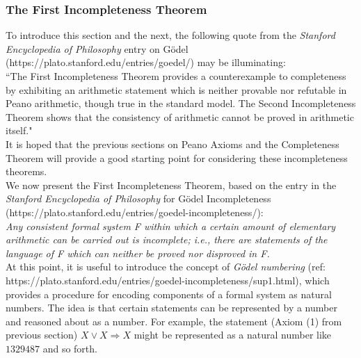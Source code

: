 \subsubsection{The First Incompleteness Theorem}

To introduce this section and the next, the following quote from the \textit{Stanford Encyclopedia of Philosophy} entry on G\"odel (https://plato.stanford.edu/entries/goedel/) may be illuminating:\\
``The First Incompleteness Theorem provides a counterexample to completeness by exhibiting an arithmetic statement which is neither provable nor refutable in Peano arithmetic, though true in the standard model.  The Second Incompleteness Theorem shows that the consistency of arithmetic cannot be proved in arithmetic itself."\\

It is hoped that the previous sections on Peano Axioms and the Completeness Theorem will provide a good starting point for considering these incompleteness theorems.\\

We now present the First Incompleteness Theorem, based on the entry in the \textit{Stanford Encyclopedia of Philosophy} for G\"odel Incompleteness (https://plato.stanford.edu/entries/goedel-incompleteness/):\\

\textit{Any consistent formal system F within which a certain amount of elementary arithmetic can be carried out is incomplete; i.e., there are statements of the language of F which can neither be proved nor disproved in F.}\\

At this point, it is useful to introduce the concept of \textit{G\"odel numbering} (ref: https://plato.stanford.edu/entries/goedel-incompleteness/sup1.html), which provides a procedure for encoding components of a formal system as natural numbers.  The idea is that certain statements can be represented by a number and reasoned about as a number.  For example, the statement (Axiom (1) from previous section) $X \lor X \Longrightarrow X$ might be represented as a natural number like $1329487$ and so forth.\\

